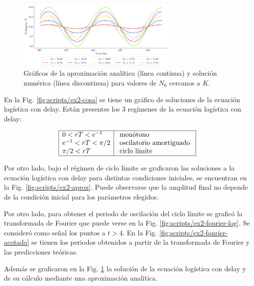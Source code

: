 \documentclass[twocolumn,aps,prl]{revtex4-1}
\begin{document}
\begin{figure}[ht!]
    \centering
        \centering
        \includegraphics[width = 0.7\textwidth]{scripts/ex2-cosaPrueba.pdf}
        \caption{Gráficos de la aproximación analítica (línea continua) y solución numérica (línea discontinua) para valores de $N_0$ cercanos a $K$.}
        \label{fig:scripts/ex2-cosaPrueba}
\end{figure}

En la Fig. \ref{fig:scripts/ex2-cosa} se tiene un gráfico de soluciones de la ecuación logística con delay. Están presentes los 3 regímenes de la ecuación logística con delay:

$$
\begin{array}{|l|l|}
\hline 0<r T <e^{-1} & \text { monótono } \\
e^{-1}<r T <\pi / 2 & \text { oscilatorio amortiguado } \\
\pi / 2<r T  & \text { ciclo límite } \\
\hline
\end{array}
$$

Por otro lado, bajo el régimen de ciclo límite se graficaron las soluciones a la ecuación logística con delay para distintas condiciones iniciales, se encuentran en la Fig. \ref{fig:scripts/ex2-aprox}. Puede observarse que la amplitud final no depende de la condición inicial para los parámetros elegidos.

Por otro lado, para obtener el periodo de oscilación del ciclo límite se graficó la transformada de Fourier que puede verse en la Fig. \ref{fig:scripts/ex2-fourier-log}. Se consideró como señal los puntos a $t>4$. En la Fig. \ref{fig:scripts/ex2-fourier-acotado} se tienen los periodos obtenidos a partir de la transformada de Fourier y las predicciones teóricas.

Además se graficaron en la Fig. \ref{fig:scripts/ex2-cosaPrueba} la solución de la ecuación logística con delay y de su cálculo mediante una aproximación analítica.
\end{document}

